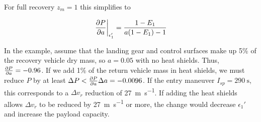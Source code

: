 \documentclass[conf]{new-aiaa}
\begin{document}
For full recovery $z_m=1$ this simplifies to

\begin{equation}
\left. \pdv{P}{a} \right|_{\epsilon_1'} = \frac{1 - E_1}{a(1 -E_1) - 1}
\end{equation}

In the example, assume that the landing gear and control surfaces make up 5\% of the recovery vehicle dry mass, so $a=0.05$ with no heat shields. Thus, $ \pdv{P}{a} = -0.96$. If we add 1\% of the return vehicle mass in heat shields, we must reduce $P$ by at least $\Delta P < \pdv{P}{a} \Delta a = -0.0096$. If the entry maneuver $I_{sp} = \SI{290}{\second}$, this corresponds to a $\Delta v_r$ reduction of \SI{27}{\meter\per\second}. If adding the heat shields allows $\Delta v_r$ to be reduced by \SI{27}{\meter\per\second} or more, the change would decrease $\epsilon_1'$ and increase the payload capacity.
\end{document}
